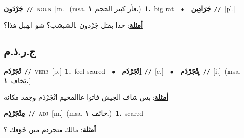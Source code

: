 \documentclass[10pt,a4paper,twoside]{article} %
\begin{document}
\begin{multicols}{2}
{\setlength\topsep{0pt}\textbf{\foreignlanguage{arabic}{جَرْدَون}}\ {\color{gray}\texttt{//}\color{black}}\ \textsc{noun}\ [m.]\ \color{gray}(msa. \foreignlanguage{arabic}{فأر كبير الحجم}~\foreignlanguage{arabic}{\textbf{١.}})\color{black}\ \textbf{1.}~big rat\ \ $\bullet$\ \ \setlength\topsep{0pt}\textbf{\foreignlanguage{arabic}{جَرَادِين}}\ {\color{gray}\texttt{//}\color{black}}\ [pl.]\  \begin{flushright}\color{gray}\foreignlanguage{arabic}{\textbf{\underline{\foreignlanguage{arabic}{أمثلة}}}: حدا بقتل جَرْدون بالشبشب؟ شو الهبل هذا؟}\end{flushright}\color{black}} \vspace{2mm}

\vspace{-3mm}
\subsection*{\color{blue}\foreignlanguage{arabic}{ج.ر.ذ.م}\color{blue}{}} 

{\setlength\topsep{0pt}\textbf{\foreignlanguage{arabic}{تْجَرْذَم}}\ {\color{gray}\texttt{//}\color{black}}\ \textsc{verb}\ [p.]\ \textbf{1.}~feel scared\ \ $\bullet$\ \ \setlength\topsep{0pt}\textbf{\foreignlanguage{arabic}{اِتْجَرْذَم}}\ {\color{gray}\texttt{//}\color{black}}\ [c.]\ \ $\bullet$\ \ \setlength\topsep{0pt}\textbf{\foreignlanguage{arabic}{يِتْجَرْذَم}}\ {\color{gray}\texttt{//}\color{black}}\ [i.]\ \color{gray}(msa. \foreignlanguage{arabic}{يَخاف}~\foreignlanguage{arabic}{\textbf{١.}})\color{black}\  \begin{flushright}\color{gray}\foreignlanguage{arabic}{\textbf{\underline{\foreignlanguage{arabic}{أمثلة}}}: بس شاف الجيش فاتوا عاالمخيم اتْجَرْذَم وجمد مكانه}\end{flushright}\color{black}} \vspace{2mm}

{\setlength\topsep{0pt}\textbf{\foreignlanguage{arabic}{مِتْجَرْذِم}}\ {\color{gray}\texttt{//}\color{black}}\ \textsc{adj}\ [m.]\ \color{gray}(msa. \foreignlanguage{arabic}{خائف}~\foreignlanguage{arabic}{\textbf{١.}})\color{black}\ \textbf{1.}~scared\  \begin{flushright}\color{gray}\foreignlanguage{arabic}{\textbf{\underline{\foreignlanguage{arabic}{أمثلة}}}: مالك متجرذم مين خَوَفك ؟}\end{flushright}\color{black}} \vspace{2mm}


\end{multicols}
\end{document}
